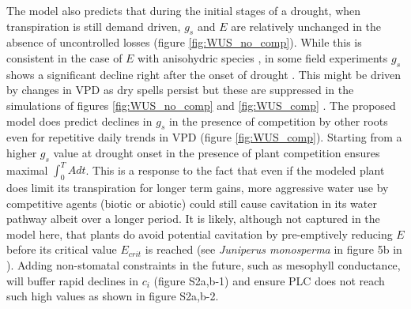 \documentclass[utf8]{frontiersSCNS} %
\begin{document}
The model also predicts that during the initial stages of a drought, when transpiration is still demand driven, $g_s$ and $E$ are relatively unchanged in the absence of uncontrolled losses (figure \ref{fig:WUS_no_comp}). While this is consistent in the case of $E$ with anisohydric species \citep{hochberg_iso/anisohydry:_2018}, in some field experiments $g_s$ shows a significant decline right after the onset of drought \citep{gollan_1985, schulze_1986}. This might be driven by changes in VPD as dry spells persist but these are suppressed in the simulations of figures \ref{fig:WUS_no_comp} and \ref{fig:WUS_comp} . The proposed model does predict declines in $g_s$ in the presence of competition by other roots even for repetitive daily trends in VPD (figure \ref{fig:WUS_comp}). Starting from a higher $g_s$ value at drought onset in the presence of plant competition ensures maximal $\int_0^T A dt$. This is a response to the fact that even if the modeled plant does limit its transpiration for longer term gains, more aggressive water use by competitive agents (biotic or abiotic) could still cause cavitation in its water pathway albeit over a longer period. It is likely, although not captured in the model here, that plants do avoid potential cavitation by pre-emptively reducing $E$ before its critical value $E_{crit}$ is reached (see \textit{Juniperus monosperma} in figure 5b in \citet{garciaforner_responses_2016}). Adding non-stomatal constraints in the future, such as mesophyll conductance, will buffer rapid declines in $c_i$ (figure S2a,b-1) and ensure PLC does not reach such high values as shown in figure S2a,b-2.
\end{document}
